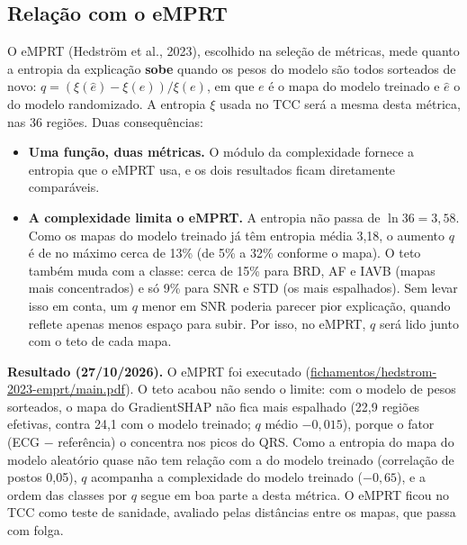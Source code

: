 \documentclass[11pt,a4paper]{article}
\begin{document}
\subsection{Relação com o eMPRT}\label{sec:emprt}
O eMPRT (Hedström et al., 2023), escolhido na seleção de métricas, mede quanto a entropia da explicação \textbf{sobe} quando os pesos do modelo são todos sorteados de novo: $q = (\xi(\hat{e}) - \xi(e))/\xi(e)$, em que $e$ é o mapa do modelo treinado e $\hat{e}$ o do modelo randomizado. A entropia $\xi$ usada no TCC será a mesma desta métrica, nas 36 regiões. Duas consequências:
\begin{itemize}
\item \textbf{Uma função, duas métricas.} O módulo da complexidade fornece a entropia que o eMPRT usa, e os dois resultados ficam diretamente comparáveis.
\item \textbf{A complexidade limita o eMPRT.} A entropia não passa de $\ln 36 = 3{,}58$. Como os mapas do modelo treinado já têm entropia média 3,18, o aumento $q$ é de no máximo cerca de 13\% (de 5\% a 32\% conforme o mapa). O teto também muda com a classe: cerca de 15\% para BRD, AF e IAVB (mapas mais concentrados) e só 9\% para SNR e STD (os mais espalhados). Sem levar isso em conta, um $q$ menor em SNR poderia parecer pior explicação, quando reflete apenas menos espaço para subir. Por isso, no eMPRT, $q$ será lido junto com o teto de cada mapa.
\end{itemize}
\textbf{Resultado (27/10/2026).} O eMPRT foi executado (\url{fichamentos/hedstrom-2023-emprt/main.pdf}). O teto acabou não sendo o limite: com o modelo de pesos sorteados, o mapa do GradientSHAP não fica mais espalhado (22,9 regiões efetivas, contra 24,1 com o modelo treinado; $q$ médio $-0{,}015$), porque o fator (ECG $-$ referência) o concentra nos picos do QRS. Como a entropia do mapa do modelo aleatório quase não tem relação com a do modelo treinado (correlação de postos 0,05), $q$ acompanha a complexidade do modelo treinado ($-0{,}65$), e a ordem das classes por $q$ segue em boa parte a desta métrica. O eMPRT ficou no TCC como teste de sanidade, avaliado pelas distâncias entre os mapas, que passa com folga.
\end{document}
